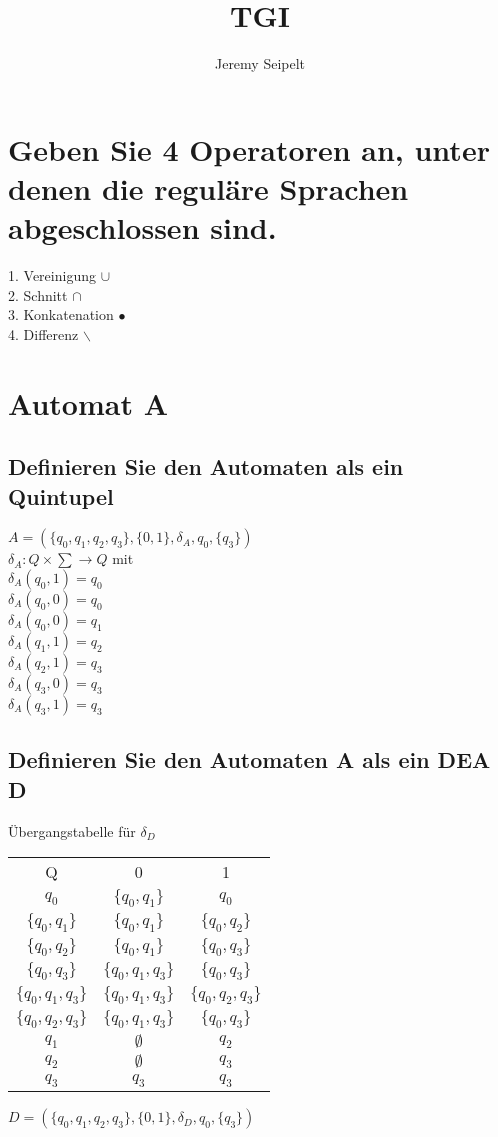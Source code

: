 \documentclass[11pt]{article} %
\title{TGI }
\author{Jeremy Seipelt}
\begin{document}
\maketitle

\section{Geben Sie 4 Operatoren an, unter denen die reguläre Sprachen abgeschlossen sind.}
1. Vereinigung $\cup$\\
2. Schnitt $\cap$\\
3. Konkatenation $\bullet$\\
4. Differenz $\backslash$
\section{Automat A}
\subsection{Definieren Sie den Automaten als ein Quintupel}
$A = (\{q_{0},q_{1},q_{2},q_{3}\},\{0,1\},\delta_{A},q_{0},\{q_{3}\})$\\
$\delta_{A}: Q \times \sum \to Q$ mit \\
$\delta_{A}(q_{0}, 1) = q_{0} $\\
$\delta_{A}(q_{0}, 0) = q_{0} $\\
$\delta_{A}(q_{0}, 0) = q_{1} $\\
$\delta_{A}(q_{1}, 1) = q_{2} $\\
$\delta_{A}(q_{2}, 1) = q_{3} $\\
$\delta_{A}(q_{3}, 0) = q_{3} $\\
$\delta_{A}(q_{3}, 1) = q_{3} $\\
\subsection{Definieren Sie den Automaten A als ein DEA D}
Übergangstabelle für $\delta_{D}$\\
 \begin{tabular}{c|c|c}
  Q & 0 & 1 \\
  $q_{0} $&$ \{q_{0},q_{1}\}$ &$ q_{0}$\\
  $\{q_{0}, q_{1}\}$&$ \{q_{0},q_{1}\}$ &$\{ q_{0}, q_{2}\}$\\
  $\{q_{0}, q_{2}\}$&$ \{q_{0},q_{1}\}$ &$\{ q_{0}, q_{3}\}$\\
  $\{q_{0}, q_{3}\}$&$ \{q_{0},q_{1},q_{3}\}$ &$\{ q_{0}, q_{3}\}$\\
  $\{q_{0}, q_{1}, q_{3}\}$&$ \{q_{0},q_{1},q_{3}\}$ &$\{ q_{0}, q_{2}, q_{3}\}$\\
  $\{q_{0}, q_{2}, q_{3}\}$&$ \{q_{0},q_{1},q_{3}\}$ &$\{ q_{0}, q_{3}\}$\\
  $q_{1} $&$ \emptyset$ &$ q_{2}$\\
  $q_{2} $&$ \emptyset$ &$ q_{3}$\\
  $q_{3} $&$q_{3}$ &$ q_{3}$\\
 \end{tabular}
$D = (\{q_{0},q_{1},q_{2},q_{3}\},\{0,1\},\delta_{D},q_{0},\{q_{3}\})$\\
\end{document}
